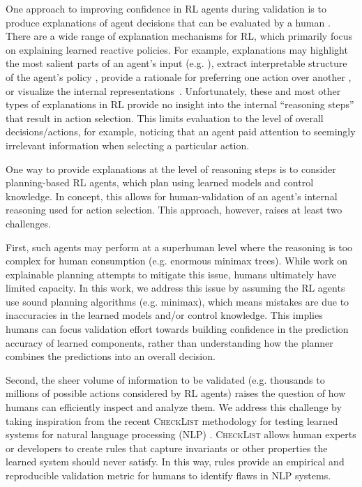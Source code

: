 \documentclass[letterpaper]{article} %
\begin{document}
One approach to improving confidence in RL agents during validation is to produce explanations of agent decisions that can be evaluated by a human \cite{puiutta2020,heuillet2021}.
There are a wide range of explanation mechanisms for RL, which primarily focus on explaining learned reactive policies. For example, explanations may highlight the most salient parts of an agent's input (e.g. \cite{pmlr-v80-greydanus18a,mott2019}), extract interpretable structure of the agent's policy \cite{MISCkoul2018learning,verma2018,asai2020,madumal2020}, provide a rationale for preferring one action over another \cite{Waa2018,juozapaitis2019,lin2021}, or visualize the internal representations~\cite{wang2018dqnviz,tabatabai2021did,mishra2022not}.
Unfortunately, these and most other types of explanations in RL provide no insight into the internal ``reasoning steps'' that result in action selection. This limits evaluation to the level of overall decisions/actions, for example, noticing that an agent paid attention to seemingly irrelevant information when selecting a particular action. 

One way to provide explanations at the level of reasoning steps is to consider planning-based RL agents, which plan using learned models and control knowledge. In concept, this allows for human-validation of an agent's internal reasoning used for action selection. This approach, however, raises at least two challenges.

First, such agents may perform at a superhuman level where the reasoning is too complex for human consumption (e.g. enormous minimax trees). While work on explainable planning \cite{fox2017,chakraborti2020} attempts to mitigate this issue, humans ultimately have limited capacity. In this work, we address this issue by assuming the RL agents use sound planning algorithms (e.g. minimax), which means mistakes are due to inaccuracies in the learned models and/or control knowledge. This implies humans can focus validation effort towards building confidence in the prediction accuracy of learned components, rather than understanding how the planner combines the predictions into an overall decision. 

Second, the sheer volume of information to be validated (e.g. thousands to millions of possible actions considered by RL agents) raises the question of how humans can efficiently inspect and analyze them.
We address this challenge by taking inspiration from the recent \textsc{CheckList} methodology for testing learned systems for natural language processing (NLP) \cite{ribeiro2020accuracy}. \textsc{CheckList} allows human experts or developers to create rules that capture invariants or other properties the learned system should never satisfy. In this way, rules provide an empirical and reproducible validation metric for humans to identify flaws in NLP systems.
\end{document}
